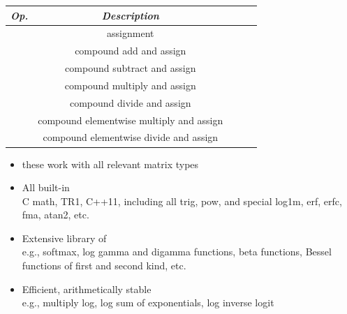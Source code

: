 \documentclass[10pt]{report}
\begin{document}
%
\vfill
\noindent\spc
{\footnotesize
  \begin{tabular}{c|ccl|l}
    {\it Op.} & {\it Description} \\ \hline \hline
    \code{=} & assignment \\
    \code{+=} & compound add and assign \\
    \code{-=} & compound subtract and assign \\
    \code{*=} & compound multiply and assign \\
    \code{/=} & compound divide and assign \\
    \code{.*=} & compound elementwise multiply and assign \\
    \code{./=} & compound elementwise divide and assign \\

  \end{tabular}
}
%
\begin{itemize}
\item these work with all relevant matrix types
\end{itemize}


%
\begin{itemize}
\item All built-in 
  \\
  {\footnotesize C math, TR1, C++11, including all trig, pow, and
    special log1m, erf, erfc, fma, atan2, etc.}
\item Extensive library of 
  \\
  {\footnotesize e.g., softmax,
    log gamma and digamma functions, beta functions, Bessel functions of
    first and second kind, etc.}
\item Efficient, arithmetically stable 
  \\
  {\footnotesize e.g., multiply log, log sum of
    exponentials, log inverse logit}
\end{itemize}
\end{document}
